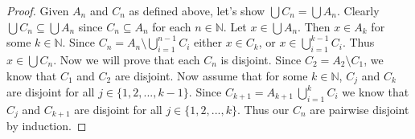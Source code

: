 \documentclass[12pt]{article}
\begin{document}
	\begin{proof}
		Given $A_n$ and $C_n$ as defined above, let's show $\bigcup C_n = \bigcup A_n$. Clearly $\bigcup C_n \subseteq \bigcup A_n$ since $C_n \subseteq A_n$ for each $n \in \mathbb{N}$. Let $x \in \bigcup A_n$. Then $x \in A_k$ for some $k \in \mathbb{N}$. Since $C_n = A_n \setminus \bigcup\limits_{i =1}^{n-1}C_i$ either $x \in C_k$, or $x \in \bigcup\limits_{i =1}^{k-1}C_i$. Thus $x \in \bigcup C_n$. \bigbreak
		Now we will prove that each $C_n$ is disjoint. Since $C_2 = A_2 \setminus C_1$, we know that $C_1$ and $C_2$ are disjoint. Now assume that for some $k \in \mathbb{N}$, $C_j$ and $C_k$ are disjoint for all $j \in \{1,2,...,k-1\}$. Since $C_{k+1} = A_{k+1} \ \bigcup\limits_{i =1}^{k}C_i$ we know that $C_j$ and $C_{k+1}$ are disjoint for all $j \in \{1,2,...,k\}$. Thus our $C_n$ are pairwise disjoint by induction.
	\end{proof}
\end{document}
